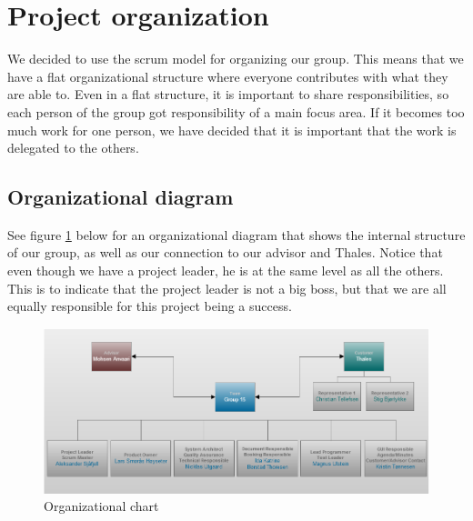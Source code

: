 

\section{Project organization}
We decided to use the scrum model for organizing our group. This means that we have a flat organizational structure where everyone contributes with what they are able to. Even in a flat structure, it is important to share responsibilities, so each person of the group got responsibility of a main focus area. If it becomes too much work for one person, we have decided that it is important that the work is delegated to the others.

\subsection{Organizational diagram}
See figure \ref{fig:organizationalchart} below for an organizational diagram that shows the internal structure of our group, as well as our connection to our advisor and Thales. Notice that even though we have a project leader, he is at the same level as all the others. This is to indicate that the project leader is not a big boss, but that we are all equally responsible for this project being a success.
\begin{figure}[hbt]
\begin{center}
\includegraphics[width=\textwidth]{Organizational_Chart_v2}
\caption{Organizational chart} \label{fig:organizationalchart}
\end{center}
\end{figure}

\newpage

